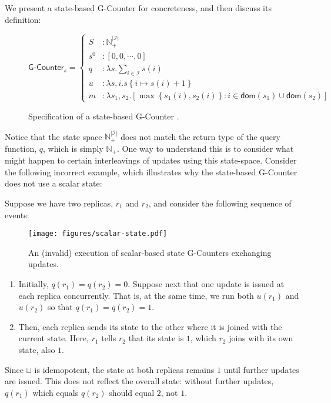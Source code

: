 We present a state-based G-Counter \CRDT for concreteness, and then discuss its
definition:

\begin{figure}[H]
  \centering
  \[
    \textsf{G-Counter}_s = \left\{\begin{aligned}
      S &: \mathbb{N}_+^{|\mathcal{I}|} \\
      s^0 &: \left[ 0, 0, \cdots, 0 \right] \\
      q &: \lambda s. \sum_{i \in \mathcal{I}} s(i) \\
      u &: \lambda s,i. s\left\{ i \mapsto s(i) + 1 \right\} \\
      m &: \lambda s_1, s_2. \left[ \max\left\{ s_1(i), s_2(i) \right\}: i \in \mathsf{dom}(s_1) \cup
      \mathsf{dom}(s_2) \right]
    \end{aligned}\right.
  \]
  \caption{Specification of a state-based \textsf{G-Counter} \CRDT.}
  \label{fig:state-gcounter}
\end{figure}

Notice that the state space $\mathbb{N}^{|\mathcal{I}|}_+$ does not match the
return type of the query function, $q$, which is simply $\mathbb{N}_+$. One way
to understand this is to consider what might happen to certain interleavings of
updates using this state-space. Consider the following incorrect example, which
illustrates why the state-based G-Counter does not use a scalar state:

\begin{example}
  \label{example:vector-state-counter}
  Suppose we have two replicas, $r_1$ and $r_2$, and consider the following
  sequence of events:

  \begin{figure}[H]
    \centering
    \texttt{[image: figures/scalar-state.pdf]}
    \caption{An (invalid) execution of scalar-based state G-Counters exchanging
      updates.}
  \end{figure}

  \begin{enumerate}
    \item Initially, $q(r_1) = q(r_2) = 0$. Suppose next that one update is
      issued at each replica concurrently. That is, at the same time, we run
      both $u(r_1)$ and $u(r_2)$ so that $q(r_1) = q(r_2) = 1$.
    \item Then, each replica sends its state to the other where it is joined
      with the current state. Here, $r_1$ tells $r_2$ that its state is $1$,
      which $r_2$ joins with its own state, also $1$.
  \end{enumerate}

  Since $\sqcup$ is idemopotent, the state at both replicas remains $1$ until
  further updates are issued. This does not reflect the overall state: without
  further updates, $q(r_1)$ which equals $q(r_2)$ should equal $2$, not $1$.
\end{example}

